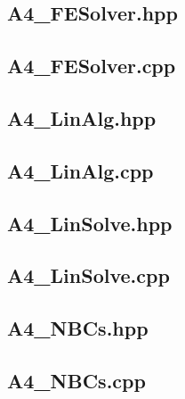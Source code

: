 \documentclass[a4paper, 12pt]{article}
\begin{document}
\subsection{A4\_FESolver.hpp} \label{subsec:FESolver.hpp}


\subsection{A4\_FESolver.cpp} \label{subsec:FESolver.cpp}


\subsection{A4\_LinAlg.hpp} \label{subsec:LinAlg.hpp}


\subsection{A4\_LinAlg.cpp} \label{subsec:LinAlg.cpp}


\subsection{A4\_LinSolve.hpp} \label{subsec:LinSolve.hpp}


\subsection{A4\_LinSolve.cpp} \label{subsec:LinSolve.cpp}


\subsection{A4\_NBCs.hpp} \label{subsec:NBCs.hpp}


\subsection{A4\_NBCs.cpp} \label{subsec:NBCs.cpp}

\end{document}
